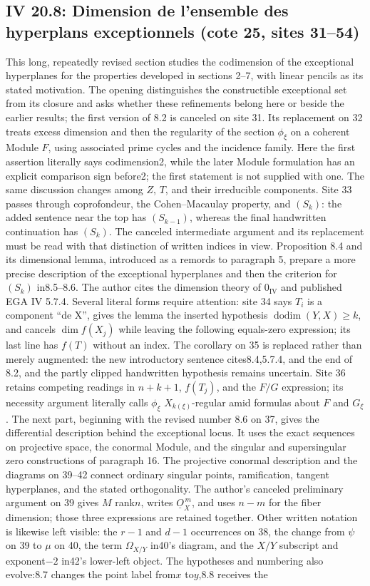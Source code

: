 \subsection*{IV 20.8: Dimension de l'ensemble des hyperplans exceptionnels (cote 25, sites 31--54)}
This long, repeatedly revised section studies the codimension of the exceptional hyperplanes for the properties developed in sections 2--7, with linear pencils as its stated motivation. The opening distinguishes the constructible exceptional set from its closure and asks whether these refinements belong here or beside the earlier results; the first version of 8.2 is canceled on site 31. Its replacement on 32 treats excess dimension and then the regularity of the section $\phi_\xi$ on a coherent Module $F$, using associated prime cycles and the incidence family. Here the first assertion literally says codimension2, while the later Module formulation has an explicit comparison sign before2; the first statement is not supplied with one. The same discussion changes among $Z$, $T$, and their irreducible components. Site 33 passes through coprofondeur, the Cohen--Macaulay property, and $(S_k)$: the added sentence near the top has $(S_{k-1})$, whereas the final handwritten continuation has $(S_k)$. The canceled intermediate argument and its replacement must be read with that distinction of written indices in view. Proposition 8.4 and its dimensional lemma, introduced as a remords to paragraph 5, prepare a more precise description of the exceptional hyperplanes and then the criterion for $(S_k)$ in8.5--8.6. The author cites the dimension theory of $0_{\mathrm{IV}}$ and published EGA IV 5.7.4. Several literal forms require attention: site 34 says $T_i$ is a component ``de X'', gives the lemma the inserted hypothesis $\operatorname{dodim}(Y,X)\geq k$, and cancels $\dim f(X_j)$ while leaving the following equals-zero expression; its last line has $f(T)$ without an index. The corollary on 35 is replaced rather than merely augmented: the new introductory sentence cites8.4,5.7.4, and the end of 8.2, and the partly clipped handwritten hypothesis remains uncertain. Site 36 retains competing readings in $n+k+1$, $f(T_j)$, and the $F/G$ expression; its necessity argument literally calls $\phi_\xi$ $X_{k(\xi)}$-regular amid formulas about $F$ and $G_\xi$. The next part, beginning with the revised number 8.6 on 37, gives the differential description behind the exceptional locus. It uses the exact sequences on projective space, the conormal Module, and the singular and supersingular zero constructions of paragraph 16. The projective conormal description and the diagrams on 39--42 connect ordinary singular points, ramification, tangent hyperplanes, and the stated orthogonality. The author's canceled preliminary argument on 39 gives $M$ rank$n$, writes $\underline{O}_X^{\,m}$, and uses $n-m$ for the fiber dimension; those three expressions are retained together. Other written notation is likewise left visible: the $r-1$ and $d-1$ occurrences on 38, the change from $\psi$ on 39 to $\mu$ on 40, the term $\Omega_{X/Y}$ in40's diagram, and the $X/Y$ subscript and exponent$-2$ in42's lower-left object. The hypotheses and numbering also evolve:8.7 changes the point label from$x$ to$y$,8.8 receives the 
